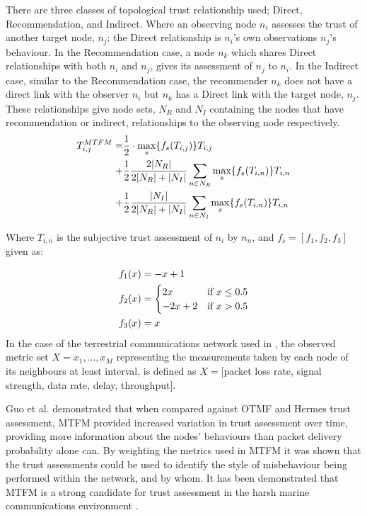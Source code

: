 There are three classes of topological trust relationship used; Direct, Recommendation, and Indirect.
Where an observing node $n_i$ assesses the trust of another target node, $n_j$; the Direct relationship is $n_i$'s own observations $n_j$'s behaviour.
In the Recommendation case, a node $n_k$ which shares Direct relationships with both $n_i$ and $n_j$, gives its assessment of $n_j$ to $n_i$.
In the Indirect case, similar to the Recommendation case, the recommender $n_k$ does not have a direct link with the observer $n_i$ but $n_k$ has a Direct link with the target node, $n_j$.
These relationships give node sets, $N_R$ and $N_I$ containing the nodes that have recommendation or indirect, relationships to the observing node respectively.
%
\begin{align}
\label{eq:networkeffects}
T_{i,j}^{MTFM}=&\frac{1}{2} \cdot \max_s\{f_s(T_{i,j})\} T_{i,j}\\ \notag
+&\frac{1}{2} \frac{2|N_R| }{2|N_R| + |N_I|}\sum_{n \in N_R} \max_s\{f_s(T_{i,n})\} T_{i,n}\\ \notag
+&\frac{1}{2} \frac{|N_I| }{2|N_R| + |N_I|}\sum_{n \in N_I} \max_s\{f_s(T_{i,n})\} T_{i,n} 
\end{align}

Where $T_{i,n}$ is the subjective trust assessment of $n_i$ by $n_n$, and $f_s = [ f_1,f_2, f_3]$ given as:

\begin{align}
\label{eq:whitenization}
f_1(x)&= -x+1\notag\\
f_2(x)&= 
\begin{cases}
2x & \text{if }x\leq 0.5\\
-2x+2 & \text{if }x>0.5
\end{cases}\\
f_3(x)&= x\notag
\end{align}
%
In the case of the terrestrial communications network used in \cite{Guo11}, the observed metric set $X = {x_1,\dots,x_M}$ representing the measurements taken by each node of its neighbours at least interval, is defined as $X=[$packet loss rate, signal strength, data rate, delay, throughput$]$.

Guo et al. demonstrated that when compared against OTMF and Hermes trust assessment, MTFM provided increased variation in trust assessment over time, providing more information about the nodes' behaviours than packet delivery probability alone can.
By weighting the metrics used in MTFM it was shown that the trust assessments could be used to identify the style of misbehaviour being performed within the network, and by whom.
It has been demonstrated that MTFM is a strong candidate for trust assessment in the harsh marine communications environment \cite{Bolster2015b}.

